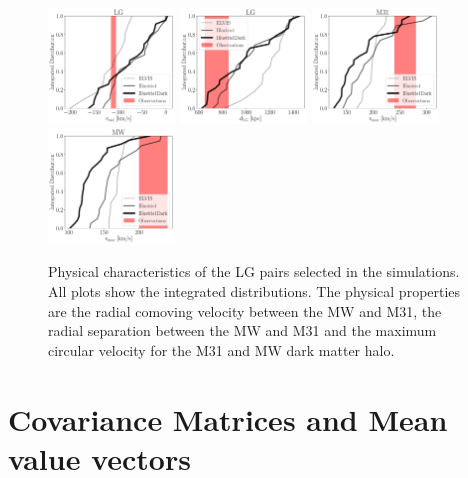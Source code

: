 \documentclass[a4paper,fleqn,usenatbib]{mnras}
\begin{document}
\begin{figure}
\centering
\includegraphics[width=0.30\textwidth]{int_distro_LG_v_rad.pdf}
\includegraphics[width=0.30\textwidth]{int_distro_LG_d.pdf}
\includegraphics[width=0.30\textwidth]{int_distro_M31_vmax.pdf}
\includegraphics[width=0.30\textwidth]{int_distro_MW_vmax.pdf}
\caption{Physical characteristics of the LG pairs selected in the
  simulations. All plots show the integrated distributions. The
  physical properties are the radial comoving velocity between the MW
  and M31, the radial separation between the MW and M31 and the
  maximum circular velocity for the M31 and MW dark matter halo.
\label{fig:physical_pairs}}
\end{figure}



\section{Covariance Matrices and Mean value vectors}
\label{appendix:matrices}
\end{document}
